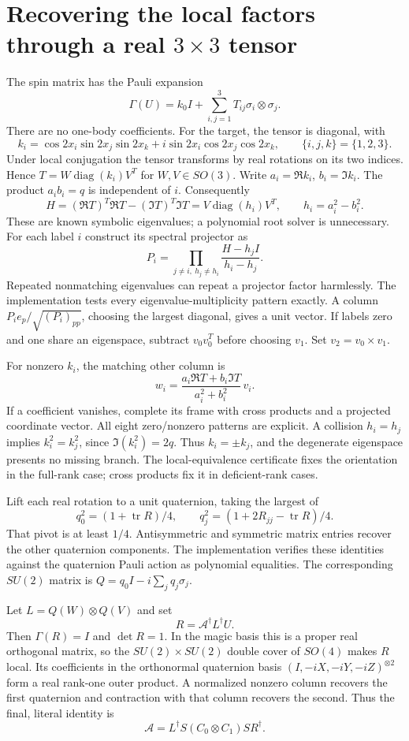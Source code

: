 \documentclass[11pt]{article}
\newcommand{\A}{\mathcal A}
\begin{document}
\section{Recovering the local factors through a real $3\times3$ tensor}
The spin matrix has the Pauli expansion
\[
 \Gamma(U)=k_0 I+\sum_{i,j=1}^3T_{ij}\sigma_i\otimes\sigma_j.
\]
There are no one-body coefficients. For the target, the tensor is diagonal,
with
\[
 k_i=\cos2x_i\sin2x_j\sin2x_k+
          i\sin2x_i\cos2x_j\cos2x_k,
 \qquad \{i,j,k\}=\{1,2,3\}.
\]
Under local conjugation the tensor transforms by real rotations on its two
indices. Hence $T=W\operatorname{diag}(k_i)V^T$ for $W,V\in SO(3)$.
Write $a_i=\Re k_i$, $b_i=\Im k_i$. The product $a_ib_i=q$ is independent
of $i$. Consequently
\[
 H=(\Re T)^T\Re T-(\Im T)^T\Im T
     =V\operatorname{diag}(h_i)V^T,\qquad h_i=a_i^2-b_i^2.
\]
These are known symbolic eigenvalues; a polynomial root solver is unnecessary.
For each label $i$ construct its spectral projector as
\[
 P_i=\prod_{j\ne i,\ h_j\ne h_i}\frac{H-h_j I}{h_i-h_j}.
\]
Repeated nonmatching eigenvalues can repeat a projector factor harmlessly.
The implementation tests every eigenvalue-multiplicity pattern exactly.
A column $P_ie_p/\sqrt{(P_i)_{pp}}$, choosing the largest diagonal, gives
a unit vector. If labels zero and one share an eigenspace, subtract
$v_0v_0^T$ before choosing $v_1$. Set $v_2=v_0\times v_1$.

For nonzero $k_i$, the matching other column is
\[
 w_i=\frac{a_i\Re T+b_i\Im T}{a_i^2+b_i^2}\,v_i.
\]
If a coefficient vanishes, complete its frame with cross products and a
projected coordinate vector. All eight zero/nonzero patterns are explicit.
A collision $h_i=h_j$ implies $k_i^2=k_j^2$, since
$\Im(k_i^2)=2q$. Thus $k_i=\pm k_j$, and the degenerate eigenspace presents
no missing branch. The local-equivalence certificate fixes the orientation
in the full-rank case; cross products fix it in deficient-rank cases.

Lift each real rotation to a unit quaternion, taking the largest of
\[
 q_0^2=(1+\operatorname{tr}R)/4,\qquad
 q_j^2=(1+2R_{jj}-\operatorname{tr}R)/4.
\]
That pivot is at least $1/4$. Antisymmetric and symmetric matrix entries
recover the other quaternion components. The implementation verifies these
identities against the quaternion Pauli action as polynomial equalities.
The corresponding $SU(2)$ matrix is $Q=q_0I-i\sum_jq_j\sigma_j$.

Let $L=Q(W)\otimes Q(V)$ and set
\[
 R=\A^\dagger L^\dagger U.
\]
Then $\Gamma(R)=I$ and $\det R=1$. In the magic basis this is a proper real
orthogonal matrix, so the $SU(2)\times SU(2)$ double cover of $SO(4)$ makes
$R$ local. Its coefficients in the orthonormal quaternion basis
$(I,-iX,-iY,-iZ)^{\otimes2}$ form a real rank-one outer product.
A normalized nonzero column recovers the first quaternion and contraction
with that column recovers the second. Thus the final, literal identity is
\[
 \boxed{\A=L^\dagger S(C_0\otimes C_1)S R^\dagger.}
\]
\end{document}
